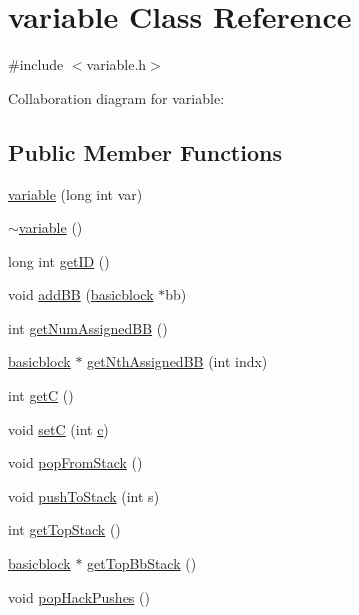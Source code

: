 \hypertarget{classvariable}{
\section{variable Class Reference}
\label{classvariable}
}


{\ttfamily \#include $<$variable.h$>$}



Collaboration diagram for variable:
\subsection*{Public Member Functions}
\begin{DoxyCompactItemize}
\item 
\hyperlink{classvariable_a0eaf13bf7764096058482fc8573673bb}{variable} (long int var)
\item 
\hyperlink{classvariable_a0d4f33ab2b101379df069ff881c4c03f}{$\sim$variable} ()
\item 
long int \hyperlink{classvariable_a1134c24e98e73b266b91d02eb253e031}{getID} ()
\item 
void \hyperlink{classvariable_acab6f948f07a2935c12917a4a2a8c46a}{addBB} (\hyperlink{classbasicblock}{basicblock} $\ast$bb)
\item 
int \hyperlink{classvariable_a53fb79e20c7ca14c872830461025c11c}{getNumAssignedBB} ()
\item 
\hyperlink{classbasicblock}{basicblock} $\ast$ \hyperlink{classvariable_a651a5439b34d9eae8ceacca7ecbfc3e8}{getNthAssignedBB} (int indx)
\item 
int \hyperlink{classvariable_a57838c6bf0ac170ee02a0e3a099aec35}{getC} ()
\item 
void \hyperlink{classvariable_ac570372e439e2d75875b8b2253069ce6}{setC} (int \hyperlink{_8AppleDouble_2sat__counter_8cpp_aa41808e37ba1ecae7ee6bde4a5c62f82}{c})
\item 
void \hyperlink{classvariable_a0d0cee61944333e78fecef0365d35cbe}{popFromStack} ()
\item 
void \hyperlink{classvariable_ae0d9d0c11701ccb08719cb5f27fa75e4}{pushToStack} (int s)
\item 
int \hyperlink{classvariable_a3f153f4bceb60929467548bd8885d61e}{getTopStack} ()
\item 
\hyperlink{classbasicblock}{basicblock} $\ast$ \hyperlink{classvariable_a3c88482acd58a7f9f38b5467d6edcff7}{getTopBbStack} ()
\item 
void \hyperlink{classvariable_a8004cca5263b1d3a296e4c5481b6db2a}{popHackPushes} ()
\end{DoxyCompactItemize}


